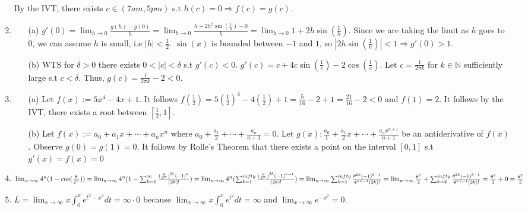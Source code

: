 \documentclass[10pt]{article}
\begin{document}
\begin{enumerate}[label= (Q-\arabic*)]
        By the IVT, there exists $c\in(7am,5pm)$ s.t $h(c)=0\Rightarrow f(c)=g(c)$.
    \item \begin{itemize}
        \item [(a)] $g'(0)=\lim_{h\rightarrow 0}\frac{g(h)-g(0)}{h}=\lim_{h\rightarrow 0}\frac{h+2h^2\sin(\frac{1}{h})-0}{h}=\lim_{h\rightarrow 0}1+2h\sin(\frac{1}{h})$.
        Since we are taking the limit as $h$ goes to $0$, we can assume $h$ is small, i.e $|h|<\frac{1}{2}$. $\sin(x)$ is bounded between $-1$ and $1$, so $|2h\sin(\frac{1}{h})|<1\Rightarrow g'(0)>1$.
        \item [(b)] WTS for $\delta>0$ there exists $0<|c|<\delta$ s.t $g'(c)<0$. $g'(c)=c+4c\sin(\frac{1}{c})-2\cos(\frac{1}{c})$. Let $c=\frac{1}{2\pi k}$ for $k\in\mathbb{N}$ sufficiently large s.t $c<\delta$. Thus, $g(c)=\frac{1}{2\pi k}-2<0$. 
    \end{itemize}
    \item \begin{itemize}
        \item [(a)] Let $f(x):=5x^4-4x+1$. It follows $f(\frac{1}{2})=5{(\frac{1}{2})}^4-4(\frac{1}{2})+1=\frac{5}{16}-2+1=\frac{21}{16}-2<0$ and $f(1)=2$. It follows by the IVT, there exists a root between $[\frac{1}{2},1]$.
        \item [(b)] Let $f(x):=a_0+a_1x+\cdots+a_n x^n$ where $a_0+\frac{a_1}{2}+\cdots+\frac{a_n}{n+1}=0$. 
        Let $g(x):\frac{a_0}{1}+\frac{a_1}{2}x+\cdots+\frac{a_nx^{n+1}}{n+1}$ be an antiderivative of $f(x)$. 
        Observe $g(0)=g(1)=0$. 
        It follows by Rolle's Theorem that there exists a point on the interval $[0,1]$ s.t $g'(x)=f(x)=0$
    \end{itemize}
    \item $\lim_{n\rightarrow\infty}4^n(1-\cos(\frac{\theta}{2^n}))\\
    =\lim_{n\rightarrow\infty}4^n(1-\sum_{k=0}^{\infty}\frac{{(\frac{\theta}{2^n})}^{2k}{{(-1)}^k}}{(2k)!})\\
    =\lim_{n\rightarrow\infty}4^n(\sum_{k=1}^{infty}\frac{{(\frac{\theta}{2^n})}^{2k}{{(-1)}^{k-1}}}{(2k)!})\\
    =\lim_{n\rightarrow\infty}\sum_{k=1}^{infty}\frac{{\theta}^{2k}{{(-1)}^{k-1}}}{{4^n}^{k-1}(2k)!}\\
    =\lim_{n\rightarrow\infty}\frac{\theta^2}{2}+\sum_{k=2}^{infty}\frac{{\theta}^{2k}{{(-1)}^{k-1}}}{{4^n}^{k-1}(2k)!}=\frac{\theta^2}{2}+0=\frac{\theta^2}{2}$
    \item $L=\lim_{x\rightarrow\infty}x\int_{0}^{x}e^{t^2-x^2}dt=\infty\cdot 0$ because $\lim_{x\rightarrow\infty}x\int_{0}^{x}e^{t^2}dt=\infty$ and $\lim_{x\rightarrow\infty}e^{-x^2}=0$.

\end{enumerate}
\end{document}
